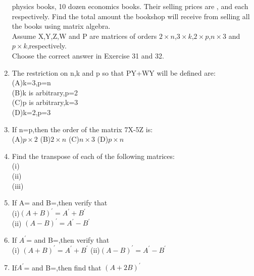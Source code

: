 \begin{enumerate}[label=\arabic*.,ref=\thesubsection.\theenumi]
physics books, 10 dozen economics books. Their selling prices are ,  and
  each respectively. Find the total amount the bookshop will receive from
selling all the books using matrix algebra.\\
Assume X,Y,Z,W and P are matrices of orders $2\times n$,$3 \times k$,$2\times p$,$n\times 3$ and $p\times k$,respectively.\\
Choose the correct answer in Exercise 31 and 32.\\
\item The restriction on n,k and p so that PY+WY will be defined are:\\
(A)k=3,p=n\\
 (B)k is arbitrary,p=2 \\
 (C)p is arbitrary,k=3 \\
 (D)k=2,p=3\\
\item If n=p,then the order of the matrix 7X-5Z is:\\
(A)$p \times 2$ (B)$2 \times n$ (C)$n \times 3$ (D)$p \times n$\\
\item Find the transpose of each of the following matrices:\\
(i)\\ (ii)\\ (iii)\\
\item If A= and B=,then verify that\\
(i)$(A+B)^{'}=A^{'}+B^{'}$ \\(ii) $(A-B)^{'}=A^{'}-B^{'}$\\
\item If $A^{'}$= and B=,then verify that\\
(i) $(A+B)^{'}=A^{'}+B^{'}$ (ii)$(A-B)^{'}=A^{'}-B^{'}$
\item If$ A^{'}$= and B=,then find that $(A+2B)^{'}$\\

\end{enumerate}
